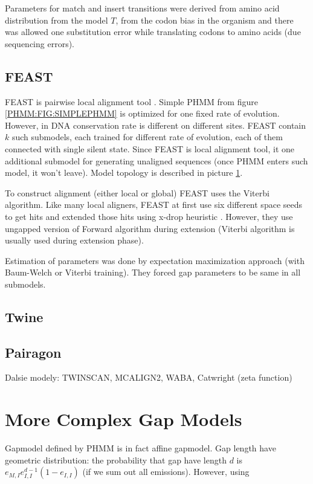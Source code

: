 Parameters for match and insert transitions were derived from amino acid
distribution from the model $T$, from the codon bias in the organism and there
was allowed one substitution error while translating codons to amino acids (due
sequencing errors).

\subsection{FEAST}
FEAST is pairwise local alignment tool \cite{FEAST2011}. Simple PHMM from figure
\ref{PHMM:FIG:SIMPLEPHMM} is optimized for one fixed rate of evolution. However,
in DNA conservation rate is different on different sites.  FEAST contain $k$
such submodels, each trained for different rate of evolution, each of them
connected with single silent state. Since FEAST is local alignment tool, it
one additional submodel for generating unaligned sequences (once PHMM enters
such model, it won't leave). Model topology is described in picture
\ref{}.

To construct alignment (either local or global) FEAST uses the Viterbi
algorithm. Like many local aligners, FEAST at first use six different space
seeds to get hits and extended those hits using x-drop heuristic \cite{}.
However, they use ungapped version of Forward algorithm during extension
(Viterbi algorithm is usually used during extension phase).

Estimation of parameters was done by expectation maximization approach (with
Baum-Welch or Viterbi training). They forced gap parameters to be same in all
submodels.

\subsection{Twine}
\subsection{Pairagon}


Dalsie modely: TWINSCAN, MCALIGN2, WABA, Catwright (zeta function)

\section{More Complex Gap Models}
Gapmodel defined by PHMM is in fact affine gapmodel.
Gap length have geometric distribution: the probability that gap have length $d$
is $e_{M,I}e_{I,I}^{d-1}(1-e_{I,I})$ (if we sum out all emissions). However,
using

